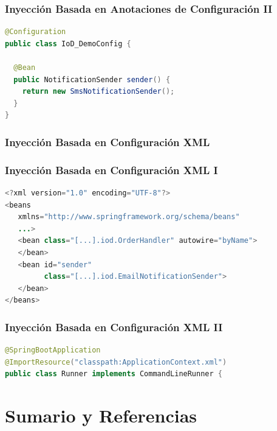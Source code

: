 \documentclass[a4paper,t,xcolor=pst,dvips,colortheme]{beamer}
\begin{document}
\begin{frame}[c,fragile]
	\frametitle{Inyección Basada en Anotaciones de Configuración II}
\begin{lstlisting}[basicstyle=\footnotesize,language=Java]
@Configuration
public class IoD_DemoConfig {
	
  @Bean
  public NotificationSender sender() {
    return new SmsNotificationSender();
  }
}
\end{lstlisting}
\end{frame}

\subsubsection{Inyección Basada en Configuración XML}

\begin{frame}[c,fragile]
	\frametitle{Inyección Basada en Configuración XML I}
\begin{lstlisting}[basicstyle=\footnotesize,language=Java]
<?xml version="1.0" encoding="UTF-8"?>
<beans
   xmlns="http://www.springframework.org/schema/beans"
   ...>
   <bean class="[...].iod.OrderHandler" autowire="byName">
   </bean>
   <bean id="sender"
         class="[...].iod.EmailNotificationSender">
   </bean>
</beans>
\end{lstlisting}
\end{frame}

\begin{frame}[c,fragile]
	\frametitle{Inyección Basada en Configuración XML II}
\begin{lstlisting}[basicstyle=\footnotesize,language=Java]
@SpringBootApplication
@ImportResource("classpath:ApplicationContext.xml")
public class Runner implements CommandLineRunner {
\end{lstlisting}
\end{frame}

\section{Sumario y Referencias}
\end{document}
